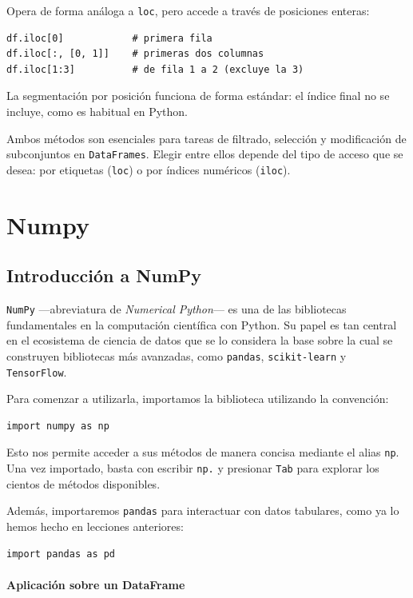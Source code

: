 \documentclass{article}
\theoremstyle{nonumberplain}
\begin{document}
Opera de forma análoga a \texttt{loc}, pero accede a través de posiciones enteras:

\begin{verbatim}
df.iloc[0]            # primera fila
df.iloc[:, [0, 1]]    # primeras dos columnas
df.iloc[1:3]          # de fila 1 a 2 (excluye la 3)
\end{verbatim}

La segmentación por posición funciona de forma estándar: el índice final no se incluye, como es habitual en Python.

Ambos métodos son esenciales para tareas de filtrado, selección y modificación de subconjuntos en \texttt{DataFrames}. Elegir entre ellos depende del tipo de acceso que se desea: por etiquetas (\texttt{loc}) o por índices numéricos (\texttt{iloc}).

\section*{Numpy}
\subsection*{Introducción a NumPy}

\texttt{NumPy} —abreviatura de \textit{Numerical Python}— es una de las bibliotecas fundamentales en la computación científica con Python. Su papel es tan central en el ecosistema de ciencia de datos que se lo considera la base sobre la cual se construyen bibliotecas más avanzadas, como \texttt{pandas}, \texttt{scikit-learn} y \texttt{TensorFlow}.

Para comenzar a utilizarla, importamos la biblioteca utilizando la convención:

\begin{verbatim}
import numpy as np
\end{verbatim}

Esto nos permite acceder a sus métodos de manera concisa mediante el alias \texttt{np}. Una vez importado, basta con escribir \texttt{np.} y presionar \texttt{Tab} para explorar los cientos de métodos disponibles.

Además, importaremos \texttt{pandas} para interactuar con datos tabulares, como ya lo hemos hecho en lecciones anteriores:

\begin{verbatim}
import pandas as pd
\end{verbatim}

\paragraph{Aplicación sobre un DataFrame}
\end{document}
